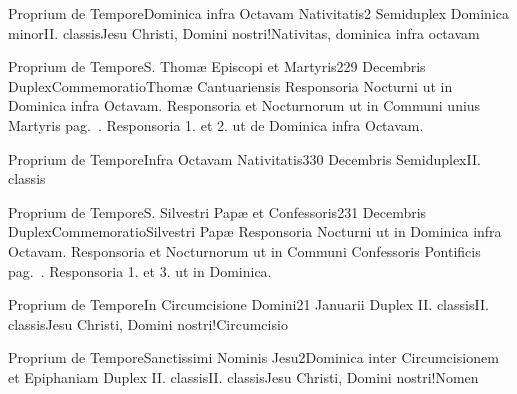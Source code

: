 \documentclass[liber-responsorialis_hiemalis.tex]{subfiles}
\begin{document}
	{Proprium de Tempore}{Dominica infra Octavam Nativitatis}{2}{}
	{Semiduplex Dominica minor}{II. classis}{Jesu Christi, Domini nostri!Nativitas, dominica infra octavam}
	{}
	{}

	{Proprium de Tempore}{S. Thomæ Episcopi et Martyris}{2}{29 Decembris}
	{Duplex}{Commemoratio}{Thomæ Cantuariensis}
	{Responsoria  Nocturni ut in Dominica infra Octavam.
		Responsoria  et  Nocturnorum ut in Communi unius Martyris pag.\ \pageref{M-UMEXN2R1}. 
	}
	{Responsoria 1. et 2. ut de Dominica infra Octavam.}

	{Proprium de Tempore}{Infra Octavam Nativitatis}{3}{30 Decembris}
	{Semiduplex}{II. classis}
	{}
	{}

	{Proprium de Tempore}{S. Silvestri Papæ et Confessoris}{2}{31 Decembris}
	{Duplex}{Commemoratio}{Silvestri Papæ}
	{Responsoria  Nocturni ut in Dominica infra Octavam.
		Responsoria  et  Nocturnorum ut in Communi Confessoris Pontificis pag.\ \pageref{M-COPON2R1}. 
	}
	{Responsoria 1. et 3. ut in Dominica.}

	{Proprium de Tempore}{In Circumcisione Domini}{2}{1 Januarii}
	{Duplex II. classis}{II. classis}{Jesu Christi, Domini nostri!Circumcisio}
	{}
	{}

	{Proprium de Tempore}{Sanctissimi Nominis Jesu}{2}{Dominica inter Circumcisionem et Epiphaniam}
	{Duplex II. classis}{II. classis}{Jesu Christi, Domini nostri!Nomen}
	{}
	{}
\end{document}
